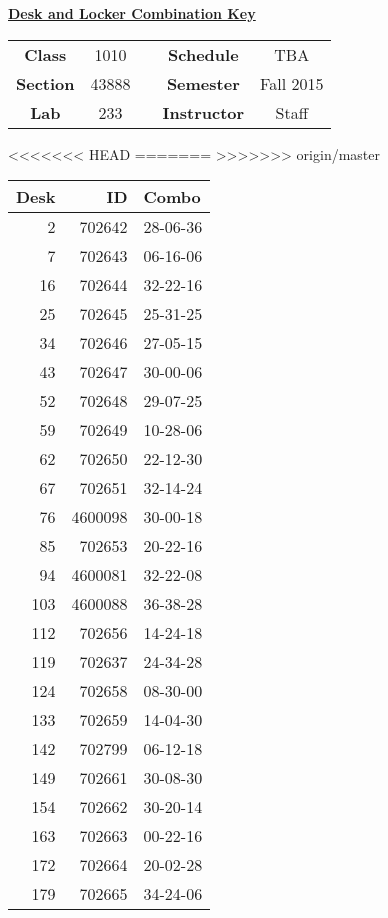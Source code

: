 \documentclass[12pt]{article}
\begin{document}
\thispagestyle{empty}

\begin{center}
	{\huge\textbf{\underline{ Desk and Locker Combination Key}}}
\end{center}


\begin{table}[h]
  \centering
  \begin{tabular}{ccccc}

  \textbf{Class} & 1010 & {\qquad} &\textbf{Schedule} & TBA \\
  \textbf{Section} & 43888 & {\qquad} & \textbf{Semester} & Fall 2015 \\
  \textbf{Lab} & 233 & {\qquad} & \textbf{Instructor} & Staff \\
  \end{tabular}
\end{table}
<<<<<<< HEAD
 \vspace{0.1in}
=======
 \vspace{0.5in}
>>>>>>> origin/master
\begin{minipage}{0.4\textwidth}

\begin{tabular}{rrl}
\toprule
 Desk &       ID &     Combo \\
\midrule
    2 &   702642 &  28-06-36 \\
    7 &   702643 &  06-16-06 \\
   16 &   702644 &  32-22-16 \\
   25 &   702645 &  25-31-25 \\
   34 &   702646 &  27-05-15 \\
   43 &   702647 &  30-00-06 \\
   52 &   702648 &  29-07-25 \\
   59 &   702649 &  10-28-06 \\
   62 &   702650 &  22-12-30 \\
   67 &   702651 &  32-14-24 \\
   76 &  4600098 &  30-00-18 \\
   85 &   702653 &  20-22-16 \\
   94 &  4600081 &  32-22-08 \\
  103 &  4600088 &  36-38-28 \\
  112 &   702656 &  14-24-18 \\
  119 &   702637 &  24-34-28 \\
  124 &   702658 &  08-30-00 \\
  133 &   702659 &  14-04-30 \\
  142 &   702799 &  06-12-18 \\
  149 &   702661 &  30-08-30 \\
  154 &   702662 &  30-20-14 \\
  163 &   702663 &  00-22-16 \\
  172 &   702664 &  20-02-28 \\
  179 &   702665 &  34-24-06 \\
\bottomrule
\end{tabular}


\end{minipage}
\end{document}
